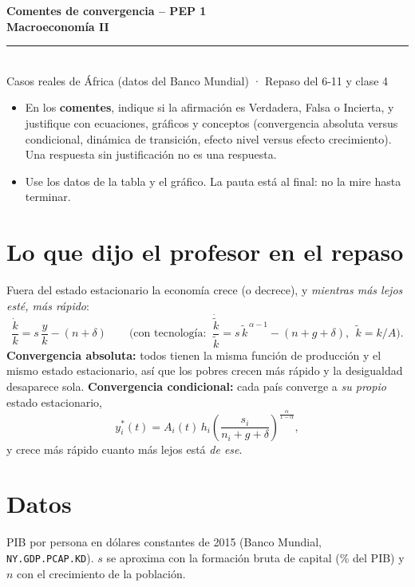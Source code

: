 \documentclass[11pt,letterpaper]{article}
\newcommand{\kt}{\tilde{k}}
\begin{document}
\begin{center}
  {\Large\bfseries Comentes de convergencia -- PEP 1}\\[2pt]
  {\large\bfseries Macroeconomía II}\\[6pt]
  \rule{\textwidth}{0.4pt}\\[2pt]
  Casos reales de África (datos del Banco Mundial) · Repaso del 6-11 y clase 4
\end{center}

\begin{itemize}
  \item En los \textbf{comentes}, indique si la afirmación es Verdadera, Falsa o Incierta, y justifique con ecuaciones,
  gráficos y conceptos (convergencia absoluta versus condicional, dinámica de transición, efecto nivel versus
  efecto crecimiento). Una respuesta sin justificación no es una respuesta.
  \item Use los datos de la tabla y el gráfico. La pauta está al final: no la mire hasta terminar.
\end{itemize}

\section*{Lo que dijo el profesor en el repaso}
Fuera del estado estacionario la economía crece (o decrece), y \emph{mientras más lejos esté, más rápido}:
\[
\frac{\dot{k}}{k} = s\,\frac{y}{k} - (n+\delta)
\qquad\text{(con tecnología: }\ \frac{\dot{\kt}}{\kt} = s\,\kt^{\,\alpha-1} - (n+g+\delta),\ \ \kt = k/A\text{)}.
\]
\textbf{Convergencia absoluta:} todos tienen la misma función de producción y el mismo estado estacionario, así que
los pobres crecen más rápido y la desigualdad desaparece sola.
\textbf{Convergencia condicional:} cada país converge a \emph{su propio} estado estacionario,
\[
y_i^*(t) = A_i(t)\,h_i\left(\frac{s_i}{n_i+g+\delta}\right)^{\frac{\alpha}{1-\alpha}},
\]
y crece más rápido cuanto más lejos está \emph{de ese}.

\section*{Datos}
PIB por persona en dólares constantes de 2015 (Banco Mundial, \texttt{NY.GDP.PCAP.KD}). $s$ se aproxima con la
formación bruta de capital (\% del PIB) y $n$ con el crecimiento de la población.
\end{document}
